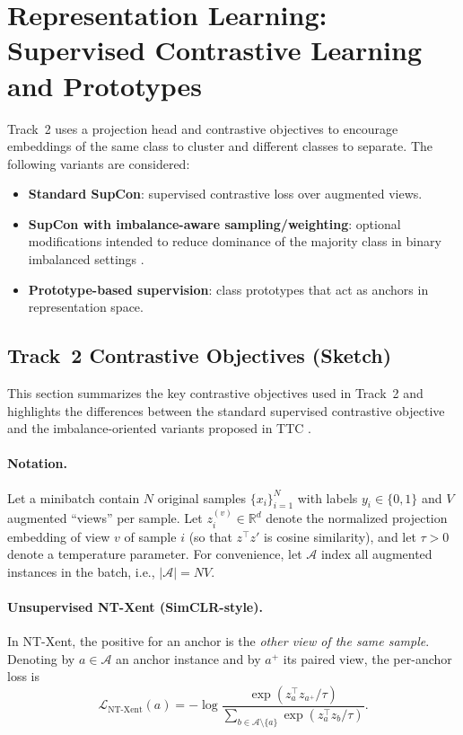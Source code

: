 \section{Representation Learning: Supervised Contrastive Learning and Prototypes}
Track~2 uses a projection head and contrastive objectives to encourage embeddings of the same class to cluster and different classes to separate. The following variants are considered:
\begin{itemize}
  \item \textbf{Standard SupCon}: supervised contrastive loss over augmented views.
  \item \textbf{SupCon with imbalance-aware sampling/weighting}: optional modifications intended to reduce dominance of the majority class in binary imbalanced settings \parencite{ttc_2025}.
  \item \textbf{Prototype-based supervision}: class prototypes that act as anchors in representation space.
\end{itemize}

\subsection{Track~2 Contrastive Objectives (Sketch)}
\label{sec:track2-objectives}
This section summarizes the key contrastive objectives used in Track~2 and highlights the differences between the standard supervised contrastive objective and the imbalance-oriented variants proposed in TTC \parencite{ttc_2025}.
\paragraph{Notation.}
Let a minibatch contain $N$ original samples $\{x_i\}_{i=1}^{N}$ with labels $y_i \in \{0,1\}$ and $V$ augmented ``views'' per sample.
Let $z_{i}^{(v)} \in \mathbb{R}^{d}$ denote the normalized projection embedding of view $v$ of sample $i$ (so that $z^\top z'$ is cosine similarity), and let $\tau>0$ denote a temperature parameter.
For convenience, let $\mathcal{A}$ index all augmented instances in the batch, i.e., $|\mathcal{A}| = NV$.

\paragraph{Unsupervised NT-Xent (SimCLR-style).}
In NT-Xent, the positive for an anchor is the \emph{other view of the same sample}.
Denoting by $a\in\mathcal{A}$ an anchor instance and by $a^{+}$ its paired view, the per-anchor loss is
\begin{equation}
  \mathcal{L}_{\text{NT-Xent}}(a)
  = -\log \frac{\exp\!\left(z_a^\top z_{a^{+}} / \tau\right)}
  {\sum\limits_{b \in \mathcal{A}\setminus\{a\}} \exp\!\left(z_a^\top z_{b} / \tau\right)}.
  \label{eq:ntxent}
\end{equation}

